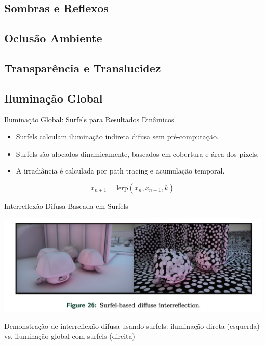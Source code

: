 \documentclass[aspectratio=169,xcolor=table]{beamer}
\begin{document}
\subsection{Sombras e Reflexos}
\subsection{Oclusão Ambiente}
\subsection{Transparência e Translucidez}
\subsection{Iluminação Global}

\begin{frame}{Iluminação Global: Surfels para Resultados Dinâmicos}
    \begin{itemize}
        \item Surfels calculam iluminação indireta difusa sem pré-computação.
        \item Surfels são alocados dinamicamente, baseados em cobertura e área dos pixels.
        \item A irradiância é calculada por path tracing e acumulação temporal.
    \end{itemize}
    \begin{equation*}
        x_{n+1} = \text{lerp}(x_n, x_{n+1}, k)
    \end{equation*}
\end{frame}

\begin{frame}{Interreflexão Difusa Baseada em Surfels}
    \begin{center}
        \includegraphics[height=0.65\textheight]{surfel-based-diffuse-interreflection}
    \end{center}
    \begin{center}
        \small{Demonstração de interreflexão difusa usando surfels: iluminação direta (esquerda) vs. iluminação global com surfels (direita)}
    \end{center}
\end{frame}
\end{document}
